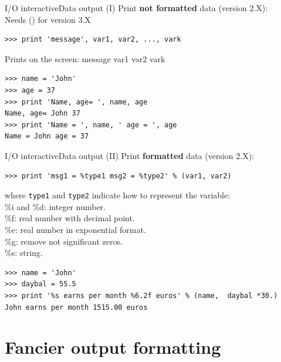 \documentclass[10pt,compress]{beamer} %
\begin{document}
\begin{frame}[fragile]{I/O interactive}{Data output (I)}
Print \textbf{not formatted} data (version 2.X):\\
Needs () for version 3.X
\begin{verbatim}
>>> print 'message', var1, var2, ..., vark
\end{verbatim}
Prints on the screen: \alert{message var1 var2 vark}
\begin{verbatim}
>>> name = 'John'
>>> age = 37
>>> print 'Name, age= ', name, age
Name, age= John 37
>>> print 'Name = ', name, ' age = ', age
Name = John age = 37
\end{verbatim}
\end{frame}

\begin{frame}[fragile]{I/O interactive}{Data output (II)}
Print \textbf{formatted} data (version 2.X):
\begin{verbatim}
>>> print 'msg1 = %type1 msg2 = %type2' % (var1, var2)
\end{verbatim}
where \texttt{type1} and   \texttt{type2} indicate how to represent the variable:\\	
\hspace{0.5cm}\%i and \%d: integer number.\\
\hspace{0.5cm}\%f: real number with decimal point.\\
\hspace{0.5cm}\%e: real number in exponential format.\\
\hspace{0.5cm}\%g: remove not significant zeros.\\
\hspace{0.5cm}\%s: string.\\
\footnotesize{\begin{verbatim}
>>> name = 'John'
>>> daybal = 55.5
>>> print '%s earns per month %6.2f euros' % (name,  daybal *30.)
John earns per month 1515.00 euros
\end{verbatim}
}
\end{frame}



\section{Fancier output formatting}
\end{document}
